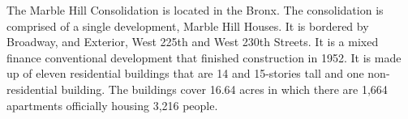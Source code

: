   

   

The Marble Hill Consolidation is located in the Bronx. The consolidation is comprised of a single development, Marble Hill Houses. It is bordered by Broadway, and Exterior, West 225th and West 230th Streets. It is a mixed finance conventional development that finished construction in 1952. It is made up of eleven residential buildings that are 14 and 15-stories tall and one non-residential building. The buildings cover 16.64 acres in which there are 1,664 apartments officially housing 3,216 people.    